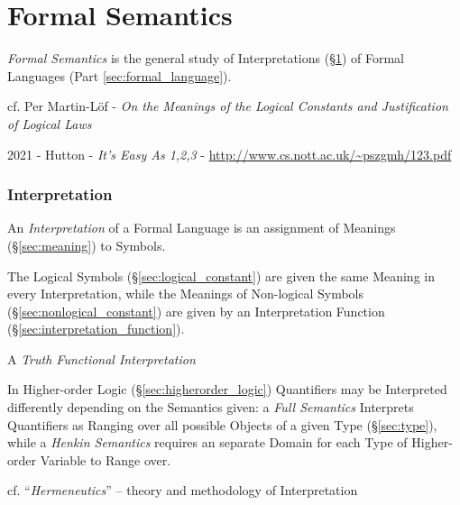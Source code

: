 \part{Formal Semantics}\label{part:formal_semantics}

\emph{Formal Semantics} is the general study of Interpretations
(\S\ref{sec:interpretation}) of Formal Languages (Part
\ref{sec:formal_language}).

cf. Per Martin-L\"of - \emph{On the Meanings of the Logical Constants and
  Justification of Logical Laws}

2021 - Hutton - \emph{It's Easy As 1,2,3} -
\url{http://www.cs.nott.ac.uk/~pszgmh/123.pdf}



\section{Interpretation}\label{sec:interpretation}

An \emph{Interpretation} of a Formal Language is an assignment of
Meanings (\S\ref{sec:meaning}) to Symbols.

The Logical Symbols (\S\ref{sec:logical_constant}) are given the same
Meaning in every Interpretation, while the Meanings of Non-logical
Symbols (\S\ref{sec:nonlogical_constant}) are given by an Interpretation
Function (\S\ref{sec:interpretation_function}).

A \emph{Truth Functional Interpretation}

In Higher-order Logic (\S\ref{sec:higherorder_logic}) Quantifiers may
be Interpreted differently depending on the Semantics given: a
\emph{Full Semantics} Interprets Quantifiers as Ranging over all
possible Objects of a given Type (\S\ref{sec:type}), while a
\emph{Henkin Semantics} requires an separate Domain for each Type of
Higher-order Variable to Range over.

cf. ``\emph{Hermeneutics}'' -- theory and methodology of Interpretation



